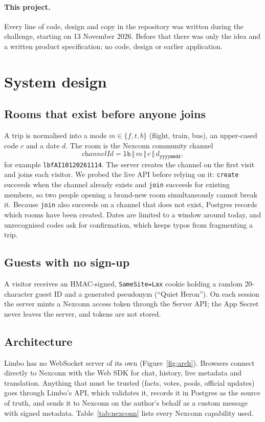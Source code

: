 \documentclass[10pt,twocolumn]{article}
\newcommand{\code}[1]{\texttt{\small #1}}
\begin{document}
\paragraph{This project.} Every line of code, design and copy in the repository was written during the challenge,
starting on 13 November 2026. Before that there was only the idea and a written product specification; no code,
design or earlier application.

\section{System design}\label{sec:room}
\subsection{Rooms that exist before anyone joins}
A trip is normalised into a mode $m\in\{f,t,b\}$ (flight, train, bus), an upper-cased code $c$ and a date $d$. The
room is the Nexconn community channel
\begin{equation}
  \textit{channelId} = \texttt{lb}\,\Vert\, m \,\Vert\, c \,\Vert\, d_{\texttt{yyyymmdd}},
\end{equation}
for example \code{lbfAI10120261114}. The server creates the channel on the first visit and joins each visitor. We
probed the live API before relying on it: \code{create} succeeds when the channel already exists and \code{join}
succeeds for existing members, so two people opening a brand-new room simultaneously cannot break it. Because
\code{join} also succeeds on a channel that does not exist, Postgres records which rooms have been created. Dates are
limited to a window around today, and unrecognised codes ask for confirmation, which keeps typos from fragmenting a
trip.

\subsection{Guests with no sign-up}
A visitor receives an HMAC-signed, \code{SameSite=Lax} cookie holding a random 20-character guest ID and a generated
pseudonym (``Quiet Heron''). On each session the server mints a Nexconn access token through the Server API; the App
Secret never leaves the server, and tokens are not stored.

\subsection{Architecture}
Limbo has no WebSocket server of its own (Figure~\ref{fig:arch}). Browsers connect directly to Nexconn with the Web
SDK for chat, history, live metadata and translation. Anything that must be trusted (facts, votes, pools, official
updates) goes through Limbo's API, which validates it, records it in Postgres as the source of truth, and sends it to
Nexconn on the author's behalf as a custom message with signed metadata. Table~\ref{tab:nexconn} lists every Nexconn
capability used.
\end{document}
